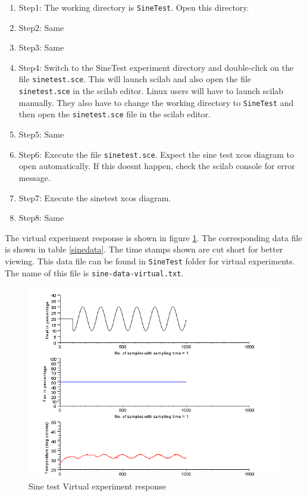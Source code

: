\begin{enumerate}
\item Step1: The working directory is {\tt  SineTest}. Open this directory.
\item Step2: Same
\item Step3: Same
\item Step4:  Switch to the SineTest experiment directory and double-click on the file {\tt sinetest.sce}. This will launch scilab and also open the file {\tt sinetest.sce} in the scilab editor. Linux users will have to launch scilab manually. They also have to change the working directory to {\tt  SineTest} and then open the {\tt  sinetest.sce} file in the scilab editor.
\item Step5: Same
\item Step6: Execute the file {\tt sinetest.sce}.  Expect the sine test xcos diagram to open automatically. If this doesnt happen, check the scilab console for error message.
\item Step7: Execute the sinetest xcos diagram.
\item Step8: Same
\end{enumerate}


 The virtual experiment response is shown in figure \ref{sine-virtual}. The corresponding data file is shown in table \ref{sinedata}. The time stamps shown are cut short for better viewing. This data file can be found in {\tt SineTest} folder for virtual experiments. The name of this file is {\tt sine-data-virtual.txt}.


\begin{figure}
\centering
\includegraphics[width=\linewidth]{sinetest_manual/sine-plot-virtual-007.png}
\caption{Sine test Virtual experiment response}
\label{sine-virtual}
\end{figure}


